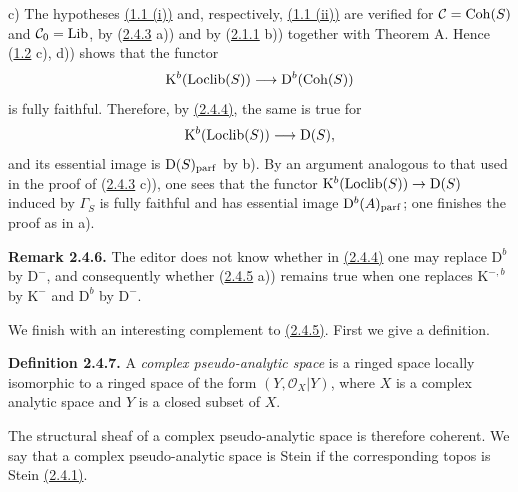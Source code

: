 c) The hypotheses \hyperlink{sga6.e02.prop.1-1}{(1.1 (i))} and, respectively, \hyperlink{sga6.e02.prop.1-1}{(1.1 (ii))} are verified for $\mathcal C=\Coh(S)$ and $\mathcal C_0=\Lib$, by (\hyperlink{sga6.e02.lem.2-4-3}{2.4.3} a)) and by (\hyperlink{sga6.e02.lem.2-1-1}{2.1.1} b)) together with Theorem A. Hence (\hyperlink{sga6.e02.prop.1-2}{1.2} c), d)) shows that the functor
\[
\mathrm K^b(\Loclib(S))\longrightarrow\mathrm D^b(\Coh(S))
\]
is fully faithful. Therefore, by \hyperlink{sga6.e02.lem.2-4-4}{(2.4.4)}, the same is true for
\[
\mathrm K^b(\Loclib(S))\longrightarrow\mathrm D(S),
\]
and its essential image is $\mathrm D(S)_{\parf}$ by b). By an argument analogous to that used in the proof of (\hyperlink{sga6.e02.lem.2-4-3}{2.4.3} c)), one sees that the functor $\mathrm K^b(\Loclib(S))\to\mathrm D(S)$ induced by $\Gamma_S$ is fully faithful and has essential image $\mathrm D^b(A)_{\parf}$; one finishes the proof as in a).

\textbf{Remark 2.4.6.} The editor does not know whether in \hyperlink{sga6.e02.lem.2-4-4}{(2.4.4)} one may replace $\mathrm D^b$ by $\mathrm D^{-}$, and consequently whether (\hyperlink{sga6.e02.prop.2-4-5}{2.4.5} a)) remains true when one replaces $\mathrm K^{-,b}$ by $\mathrm K^{-}$ and $\mathrm D^b$ by $\mathrm D^{-}$.

We finish with an interesting complement to \hyperlink{sga6.e02.prop.2-4-5}{(2.4.5)}. First we give a definition.

\textbf{Definition 2.4.7.} A \emph{complex pseudo-analytic space} is a ringed space locally isomorphic to a ringed space of the form $(Y,\mathcal O_X|Y)$, where $X$ is a complex analytic space and $Y$ is a closed subset of $X$.

The structural sheaf of a complex pseudo-analytic space is therefore coherent. We say that a complex pseudo-analytic space is Stein if the corresponding topos is Stein \hyperlink{sga6.e02.def.2-4-1}{(2.4.1)}.



\providecommand{\Qcoh}{\operatorname{Qcoh}}
\providecommand{\Mod}{\operatorname{Mod}}
\providecommand{\Coh}{\operatorname{Coh}}
\providecommand{\Ob}{\operatorname{Ob}}
\providecommand{\Hom}{\operatorname{Hom}}
\providecommand{\Ext}{\operatorname{Ext}}
\providecommand{\Spec}{\operatorname{Spec}}
\providecommand{\qcoh}{\mathrm{qcoh}}
\providecommand{\parf}{\mathrm{parf}}
\providecommand{\coh}{\mathrm{coh}}
\providecommand{\Loclib}{\operatorname{Loclib}}
\providecommand{\Lib}{\operatorname{Lib}}
\providecommand{\im}{\operatorname{Im}}

